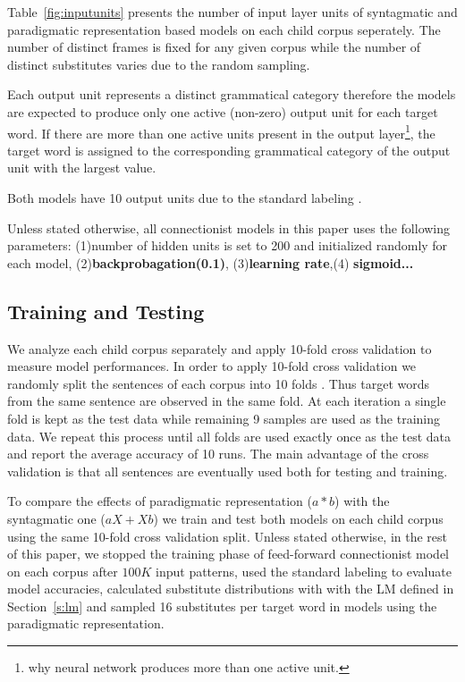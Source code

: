Table~\ref{fig:inputunits} presents the number of input layer units of
syntagmatic and paradigmatic representation based models on each child
corpus seperately.  The number of distinct frames is fixed for any
given corpus while the number of distinct substitutes varies due to
the random sampling.

Each output unit represents a distinct grammatical category therefore the
models are expected to produce only one active (non-zero) output unit for each
target word.  If there are more than one active units present in the output
layer\footnote{why neural network produces more than one active unit.}, the
target word is assigned to the corresponding grammatical category of the output
unit with the largest value.

Both models have 10 output units due to the standard labeling
\citep*{Mintz200391}.

Unless stated otherwise, all connectionist models in this paper uses the
following parameters: (1)number of hidden units is set to 200 and initialized
randomly for each model, (2){\bf backprobagation(0.1)}, (3){\bf learning
rate},(4) {\bf sigmoid...}

\subsection{Training and Testing}
\label{sec:training}

We analyze each child corpus separately and apply 10-fold cross validation to
measure model performances.  In order to apply 10-fold cross validation we
randomly split the sentences of each corpus into 10 folds .  Thus target words
from the same sentence are observed in the same fold.  At each iteration a
single fold is kept as the test data while remaining 9 samples are used as the
training data.  We repeat this process until all folds are used exactly once as
the test data and report the average accuracy of 10 runs.  The main advantage
of the cross validation is that all sentences are eventually used both for
testing and training.

To compare the effects of paradigmatic representation ($a*b$) with the
syntagmatic one ($aX+Xb$) we train and test both models on each child corpus
using the same 10-fold cross validation split.  Unless stated otherwise, in the
rest of this paper, we stopped the training phase of feed-forward connectionist
model on each corpus after $100K$ input patterns, used the standard labeling to
evaluate model accuracies, calculated substitute distributions with with the LM
defined in Section~\ref{s:lm} and sampled 16 substitutes per target word in
models using the paradigmatic representation.


